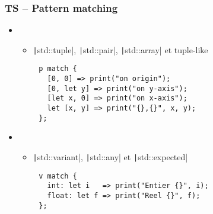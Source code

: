 \documentclass[C++.tex]{subfiles}
\begin{document}
\begin{frame}[fragile]
	\frametitle{TS -- Pattern matching}
	\begin{itemize}
		\item[]
		\begin{itemize}
			\item \texttt|std::tuple|, \texttt|std::pair|, \texttt|std::array| et tuple-like
		\end{itemize}
	\end{itemize}

	\begin{verbatim}
		p match {
		  [0, 0] => print("on origin");
		  [0, let y] => print("on y-axis");
		  [let x, 0] => print("on x-axis");
		  let [x, y] => print("{},{}", x, y);
		};
	\end{verbatim}

	\begin{itemize}
		\item []
		\begin{itemize}
			\item \texttt|std::variant|, \texttt|std::any| et \texttt|std::expected|
		\end{itemize}
	\end{itemize}

	\begin{verbatim}
		v match {
		  int: let i   => print("Entier {}", i);
		  float: let f => print("Reel {}", f);
		};
	\end{verbatim}

	\begin{codesample}
		\sample{https://godbolt.org/#g:!((g:!((g:!((h:codeEditor,i:(filename:'1',fontScale:14,fontUsePx:'0',j:1,lang:c%

}
\end{codesample}
\end{frame}
\end{document}

